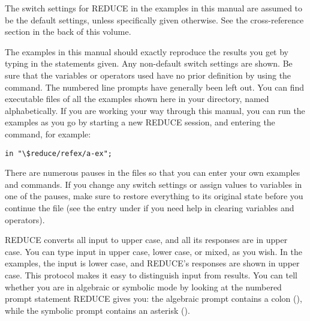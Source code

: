 The switch settings for REDUCE in the examples in this manual are assumed to 
be the default settings, unless specifically given otherwise.  See the
cross-reference section  in the back of this volume.

The examples in this manual should exactly reproduce the results you get
by typing in the statements given.  Any non-default switch settings are 
shown.  Be sure that the variables or operators used have no prior definition
by using the  command.  The numbered line prompts have generally
been left out.  You can find executable files of all the examples shown here
in your  directory, named alphabetically.  If you are
working your way through this manual, you can run the examples as you go by
starting a new REDUCE session, and entering the command, for example:
\begin{verbatim}
in "\$reduce/refex/a-ex";
\end{verbatim}
There are numerous pauses in the files so that you can enter your own
examples and commands.  If you change any switch settings or assign values
to variables in one of the pauses, make sure to restore everything to its
original state before you continue the file  (see the entry under 
if you need help in clearing variables and operators).

REDUCE converts all input to upper case, and all its responses are in upper
case.  You can type input in  upper case, lower case, or mixed, as you wish.  
In the examples, the input is lower case, and REDUCE's responses are shown in
upper case.  This protocol makes it easy to distinguish input from results.
You can tell whether you are in algebraic or symbolic mode by looking at the
numbered prompt statement REDUCE gives you:  the algebraic prompt contains
a colon (\name{:}), while the symbolic prompt contains an asterisk (\name{*}).



